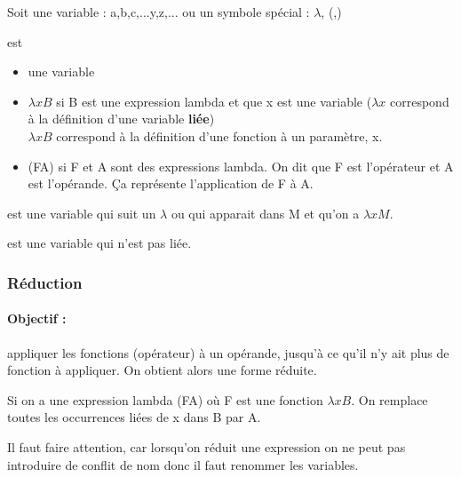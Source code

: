 \begin{mydef} Soit une variable : a,b,c,...y,z,... ou un 
	symbole spécial : $\lambda$, (,)
\end{mydef}

\begin{mydef} est
	\begin{itemize}
		\item une variable
		\item $\lambda xB$ si B est une expression lambda et que x est 
			une variable ($\lambda x$ correspond à la définition 
			d'une variable \textbf{liée}) \\
			$\lambda xB$ correspond à la définition d'une fonction 
			à un paramètre, x.
		\item (FA) si F et A sont des expressions lambda. On dit que F 
			est l'opérateur et A est l'opérande. Ça représente 
			l'application de F à A.
	\end{itemize}
\end{mydef}

\begin{mydef} est une variable qui suit un $\lambda$ ou qui 
	apparait dans M et qu'on a $\lambda xM$. 
\end{mydef}

\begin{mydef} est une variable qui n'est pas liée.
\end{mydef}

\subsubsection{Réduction}

\paragraph{Objectif :} appliquer les fonctions (opérateur) à un opérande, 
jusqu'à ce qu'il n'y ait plus de fonction à appliquer. On obtient alors une 
forme réduite.

\begin{mydef} Si on a une expression lambda (FA) où 
	F est une fonction $\lambda xB$. On remplace toutes les occurrences liées 
	de x dans B par A.
\end{mydef}

\begin{myrem}
	Il faut faire attention, car lorsqu'on réduit une expression on ne peut 
	pas introduire de conflit de nom donc il faut renommer les variables.
\end{myrem}

